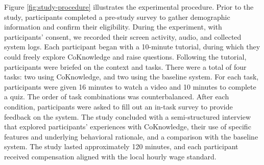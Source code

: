 
Figure \ref{fig:study-procedure} illustrates the experimental procedure. Prior to the study, participants completed a pre-study survey to gather demographic information and confirm their eligibility. During the experiment, with participants' consent, we recorded their screen activity, audio, and collected system logs.  Each participant began with a 10-minute tutorial, during which they could freely explore CoKnowledge and raise questions. Following the tutorial, participants were briefed on the context and tasks. There were a total of four tasks: two using CoKnowledge, and two using the baseline system. For each task, participants were given 16 minutes to watch a video and 10 minutes to complete a quiz. The order of task combinations was counterbalanced.
After each condition, participants were asked to fill out an in-task survey to provide feedback on the system. The study concluded with a semi-structured interview that explored participants' experiences with CoKnowledge, their use of specific features and underlying behavioral rationale,  and a comparison with the baseline system.
The study lasted approximately 120 minutes, and each participant received compensation aligned with the local hourly wage standard.



